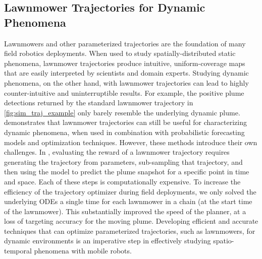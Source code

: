 \subsection{Lawnmower Trajectories for Dynamic Phenomena}
Lawnmowers and other parameterized trajectories are the foundation of many field robotics deployments. When used to study spatially-distributed static phenomena, lawnmower trajectories produce intuitive, uniform-coverage maps that are easily interpreted by scientists and domain experts. Studying dynamic phenomena, on the other hand, with lawnmower trajectories can lead to highly counter-intuitive and uninterruptible results. For example, the positive plume detections returned by the standard lawnmower trajectory in \cref{fig:sim_traj_example} only barely resemble the underlying dynamic plume. \PHORTEX demonstrates that lawnmower trajectories can still be useful for characterizing dynamic phenomena, when used in combination with probabilistic forecasting models and optimization techniques. However, these methods introduce their own challenges. In \PHORTEX, evaluating the reward of a lawnmower trajectory requires generating the trajectory from parameters, sub-sampling that trajectory, and then using the \PHUMES model to predict the plume snapshot for a specific point in time and space. Each of these steps is computationally expensive. To increase the efficiency of the trajectory optimizer during field deployments, we only solved the underlying \PHUMES ODEs a single time for each lawnmower in a chain (at the start time of the lawnmower). This substantially improved the speed of the planner, at a loss of targeting accuracy for the moving plume. Developing efficient and accurate techniques that can optimize parameterized trajectories, such as lawnmowers, for dynamic environments is an imperative step in effectively studying spatio-temporal phenomena with mobile robots.


